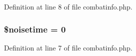 Definition at line 8 of file combatinfo.\+php.

\hypertarget{combatinfo_8php_ae07a3a4af6a972e7422e1ee9d83a089b}{
\subsubsection[{\$noisetime}]{\setlength{\rightskip}{0pt plus 5cm}\$noisetime = 0}}\label{combatinfo_8php_ae07a3a4af6a972e7422e1ee9d83a089b}


Definition at line 7 of file combatinfo.\+php.

